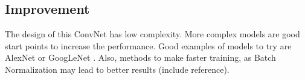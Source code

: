 \documentclass[]{article}
\begin{document}
\subsection{Improvement}\label{improvement}

The design of this ConvNet has low complexity. More complex models are good start points to increase the performance. Good examples of models to try are AlexNet \cite{Krizhevsky12} or GoogLeNet \cite{Szegedy16}. Also, methods to make faster training, as Batch Normalization may lead to better results (include reference).

\end{document}
